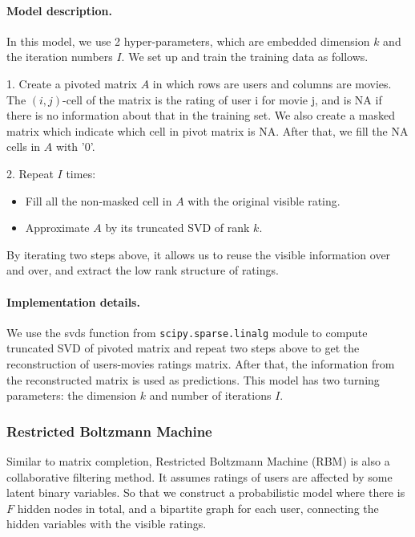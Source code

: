 \documentclass[bj, preprint]{imsart}
\begin{document}
\paragraph{Model description.}\label{par:method.models.svd.model}
In this model, we use 2 hyper-parameters, which are embedded dimension $k$ and the iteration numbers $I$. We set up and train the training data as follows.

1. Create a pivoted matrix $A$ in which rows are users and columns are movies. The $(i,j)$-cell of the matrix is the rating of user i for movie j, and is NA if there is no information about that in the training set. We also create a masked matrix which indicate which cell in pivot matrix is NA. After that, we fill the NA cells in $A$ with '0'.

2. Repeat $I$ times: 
\begin{itemize}
	\item Fill all the non-masked cell in $A$ with the original visible rating.
	\item Approximate $A$ by its truncated SVD of rank $k$. 
\end{itemize}
By iterating two steps above, it allows us to reuse the visible information over and over, and extract the low rank structure of ratings. 




\paragraph{Implementation details.}\label{par:method.models.svd.impl}
We use the svds function from \texttt{scipy.sparse.linalg} module to compute truncated SVD of pivoted matrix and repeat two steps above to get the reconstruction of users-movies ratings matrix. After that, the information from the reconstructed matrix is used as predictions. This model has two turning parameters: the dimension $k$ and number of iterations $I$.  


\subsubsection{Restricted Boltzmann Machine}\label{subsubsec:method.models.rbm}
Similar to matrix completion, Restricted Boltzmann Machine (RBM) is also a collaborative filtering method. It assumes ratings of users are affected by some latent binary variables. So that we construct a probabilistic model where there is $F$ hidden nodes in total, and a bipartite graph for each user, connecting the hidden variables with the visible ratings. 
\end{document}
